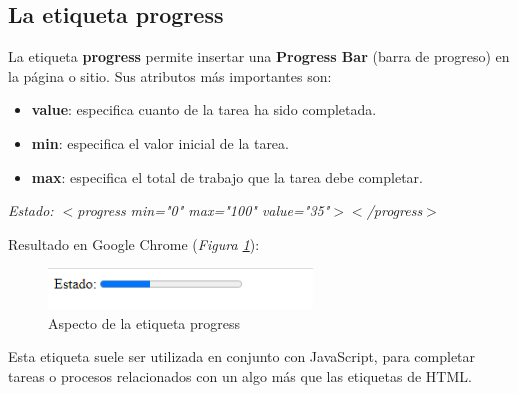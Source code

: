 \subsection{La etiqueta progress}
\hspace{0.55cm}La etiqueta \textbf{progress} permite insertar una \textbf{Progress Bar} (barra de progreso) en la página o sitio. Sus atributos más importantes son:
\begin{itemize}
    \item \textbf{value}: especifica cuanto de la tarea ha sido completada.
    \item \textbf{min}: especifica el valor inicial de la tarea.
    \item \textbf{max}: especifica el total de trabajo que la tarea debe completar.
\end{itemize}
\begin{center}
    \textit{Estado: $<$progress min="0" max="100" value="35"$>$$<$/progress$>$}
\end{center}

Resultado en Google Chrome (\textit{Figura \ref{fig: 17}}):
\begin{figure}[H]
    \centering
    \caption{Aspecto de la etiqueta progress}
    \label{fig: 17}
    \includegraphics[width=7cm]{ss_html/progress.png}
\end{figure}

Esta etiqueta suele ser utilizada en conjunto con JavaScript, para completar tareas o procesos relacionados con un algo más que las etiquetas de HTML.